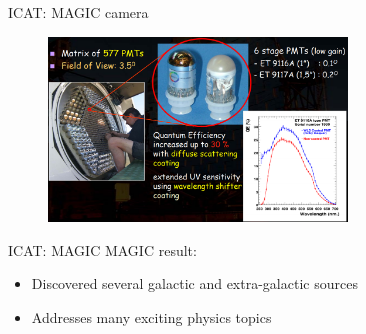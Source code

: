 \documentclass{beamer}
\begin{document}
\begin{frame}{ICAT: MAGIC camera}
    \begin{figure}[h]
        \includegraphics[width=300px]{MAGIC_PMTs.png}
    \end{figure}
\end{frame}


\begin{frame}{ICAT: MAGIC}
    MAGIC result:
    \begin{itemize}
        \item Discovered several galactic and extra-galactic sources
        \item Addresses many exciting physics topics
    \end{itemize}
\end{frame}
\end{document}
